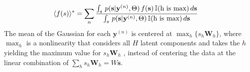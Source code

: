 \documentclass[12pt]{article}
\renewcommand{\vec}[1]{{\mathbf{#1}}}
\begin{document}
\begin{description}
\begin{align}
%
&\rev{\langle f(s) \rangle^\ast} = \sum_n \frac{ \int_s \, p(\vec{s}|\vec{y}^{(n)},\Theta) \, f(\vec{s}) \, \mathbb{I}(\text{h is max}) \, d\vec{s} }
                                       { \int_s \, p(\vec{s}|\vec{y}^{(n)},\Theta) \, \mathbb{I}(\text{h is max}) \, d\vec{s} } \nonumber
\end{align}
%
The mean of the Gaussian for each $\vec{y}^{(n)}$ is centered at $\max_{h}\{s_h\vec{W}_{h}\}$, where $\max_{h}$ is a nonlinearity that considers all $H$ latent components and takes the $h$ yielding the maximum value for $s_h\vec{W}_{h}$ \citep{LuckeSahani2008,SheltonEtAl2012,BornscheinEtAl2013,SheltonEtAl2015}, instead of centering the data at the linear combination of $\sum_h s_h\vec{W}_h=W\vec{s}$.
%
\end{description}
\end{document}
